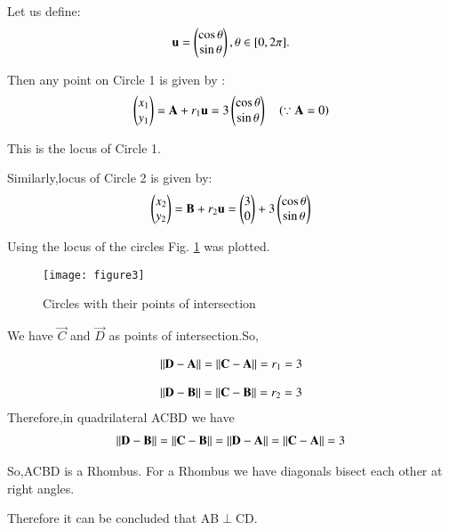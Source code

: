 \documentclass[journal,12pt,twocolumn]{IEEEtran}
\begin{document}
Let us define:
\begin{align}
\mathbf{u}=\begin{pmatrix}\cos \theta\\  \sin \theta\end{pmatrix},  \theta \in [0,2\pi].
\end{align}

Then any point  on Circle 1 is given by :
\begin{align}
\begin{pmatrix}x_{1}\\y_{1}\end{pmatrix}=\mathbf{A}+r_{1}\mathbf{u}=3\begin{pmatrix}\cos \theta\\ \sin \theta\end{pmatrix}\quad \left(\because \mathbf{A}=0\right)
\end{align}

 This is the locus of Circle 1.

Similarly,locus of Circle 2 is given by:
\begin{align}
\begin{pmatrix}x_{2}\\y_{2}\end{pmatrix}=\mathbf{B}+r_{2}\mathbf{u}=\begin{pmatrix}3\\0\end{pmatrix}+3\begin{pmatrix}\cos\theta\\  \sin \theta\end{pmatrix}
\end{align}

Using the locus of the circles Fig. \ref{fig:circle} was plotted.

\begin{figure}[H]
\centering
\texttt{[image: figure3]}
\caption{Circles with their points of intersection}
\label{fig:circle}	
\end{figure}

We have $\vec{C}$ and $\vec{D}$ as points of intersection.So,

\begin{align}
\lVert\mathbf{D}-\mathbf{A}\rVert = \lVert\mathbf{C}-\mathbf{A}\rVert=r_{1}=3
\end{align}

\begin{align}
\lVert\mathbf{D}-\mathbf{B}\rVert = \lVert\mathbf{C}-\mathbf{B}\rVert=r_{2}=3
\end{align}
Therefore,in quadrilateral ACBD we have
\begin{align}
\lVert\mathbf{D}-\mathbf{B}\rVert = \lVert\mathbf{C}-\mathbf{B}\rVert=\lVert\mathbf{D}-\mathbf{A}\rVert = \lVert\mathbf{C}-\mathbf{A}\rVert=3
\end{align}

So,ACBD is a Rhombus.
For a Rhombus we have diagonals bisect each other at right angles.

Therefore it can be concluded that AB$\perp$CD.
\end{document}
